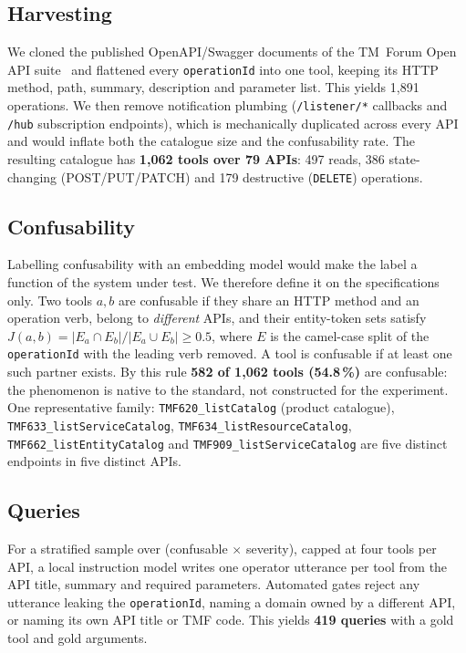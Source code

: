 \subsection{Harvesting}
We cloned the published OpenAPI/Swagger documents of the TM~Forum Open API
suite~\cite{tmforum} and flattened every \texttt{operationId} into one tool,
keeping its HTTP method, path, summary, description and parameter list. This
yields 1,891 operations. We then remove notification plumbing
(\texttt{/listener/*} callbacks and \texttt{/hub} subscription endpoints),
which is
mechanically duplicated across every API and would inflate both the catalogue
size and the confusability rate. The resulting catalogue has \textbf{1,062
tools over 79 APIs}: 497 reads, 386 state-changing (POST/PUT/PATCH) and
179 destructive (\texttt{DELETE}) operations.

\subsection{Confusability}
Labelling confusability with an embedding model would make the label a function
of the system under test. We therefore define it on the specifications only.
Two tools $a,b$ are confusable if they share an HTTP method and an operation
verb, belong to \emph{different} APIs, and their entity-token sets satisfy
$J(a,b)=|E_a\cap E_b|/|E_a\cup E_b|\ge 0.5$, where $E$ is the camel-case split
of the \texttt{operationId} with the leading verb removed. A tool is confusable
if at least one such partner exists. By this rule \textbf{582 of
1,062 tools (54.8\,\%)} are confusable: the phenomenon is native
to the standard, not constructed for the experiment. One representative family: \texttt{TMF620\_\allowbreak listCatalog} (product catalogue),
\texttt{TMF633\_\allowbreak listServiceCatalog}, \texttt{TMF634\_\allowbreak listResourceCatalog},
\texttt{TMF662\_\allowbreak listEntityCatalog} and \texttt{TMF909\_\allowbreak listServiceCatalog}
are five distinct endpoints in five distinct APIs.



\subsection{Queries}
For a stratified sample over (confusable $\times$ severity), capped at four
tools per API, a local instruction model writes one operator utterance per
tool from the API title, summary and required parameters. Automated gates
reject any utterance leaking the \texttt{operationId}, naming a domain owned
by a different API, or naming its own API title or TMF code. This yields
\textbf{419 queries} with a gold tool and gold arguments.
